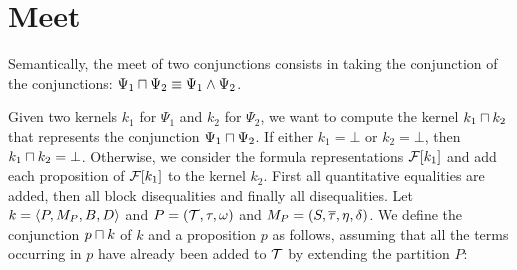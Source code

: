 \section{Meet}

Semantically, the meet of two conjunctions consists in taking the conjunction of the conjunctions:
$\Psi_1 \sqcap \Psi_2 \equiv \Psi_1 \land \Psi_2$.

Given two kernels $k_1$ for $\Psi_1$ and $k_2$ for $\Psi_2$,
we want to compute the kernel $k_1 \sqcap k_2$ that represents the conjunction $\Psi_1 \sqcap \Psi_2$.
If either $k_1 = \bot$ or $k_2 = \bot$, then $k_1 \sqcap k_2 = \bot$.
Otherwise, we consider the formula representations $\mathcal{F}[k_1]$ and add each proposition of $\mathcal{F}[k_1]$ to the kernel $k_2$.
First all quantitative equalities are added, then all block disequalities and finally all disequalities.
Let $k = \langle P,M_P,B,D\rangle$ and $P = (\mathcal{T}, \tau, \omega)$ and $M_P = (S, \overline{\tau}, \eta, \delta)$.
We define the conjunction $p \sqcap k$ of $k$ and a proposition $p$ as follows,
assuming that all the terms occurring in $p$ have already been added to $\mathcal{T}$ by extending the partition $P$:
